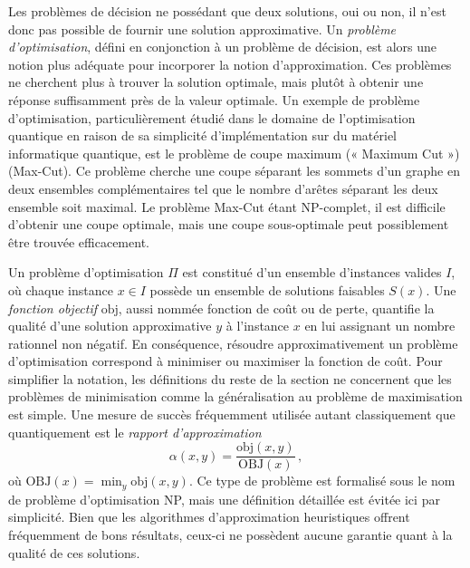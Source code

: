 Les problèmes de décision ne possédant que deux solutions, oui ou non, il n'est donc pas possible de fournir une solution approximative. Un \textit{problème d'optimisation}, défini en conjonction à un problème de décision, est alors une notion plus adéquate pour incorporer la notion d'approximation. Ces problèmes ne cherchent plus à trouver la solution optimale, mais plutôt à obtenir une réponse suffisamment près de la valeur optimale. Un exemple de problème d'optimisation, particulièrement étudié dans le domaine de l'optimisation quantique en raison de sa simplicité d'implémentation sur du matériel informatique quantique, est le problème de coupe maximum (­« Maximum Cut ») (Max-Cut). Ce problème cherche une coupe séparant les sommets d'un graphe en deux ensembles complémentaires tel que le nombre d'arêtes séparant les deux ensemble soit maximal. Le problème Max-Cut étant \textsf{NP}-complet, il est difficile d'obtenir une coupe optimale, mais une coupe sous-optimale peut possiblement être trouvée efficacement.

Un problème d'optimisation $\Pi$ est constitué d'un ensemble d'instances valides $I$, où chaque instance $x \in I$ possède un ensemble de solutions faisables $S(x)$. Une \textit{fonction objectif} $\text{obj}$, aussi nommée fonction de coût ou de perte, quantifie la qualité d'une solution approximative $y$ à l'instance $x$ en lui assignant un nombre rationnel non négatif. En conséquence, résoudre approximativement un problème d'optimisation correspond à minimiser ou maximiser la fonction de coût. Pour simplifier la notation, les définitions du reste de la section ne concernent que les problèmes de minimisation comme la généralisation au problème de maximisation est simple. Une mesure de succès fréquemment utilisée autant classiquement que quantiquement est le \textit{rapport d'approximation}
\begin{equation}
    \alpha(x, y) = \frac{\text{obj}(x, y)}{\text{OBJ}(x)} \,,
\end{equation}
où $\text{OBJ}(x) = \min_{y} \text{obj} (x, y)$. Ce type de problème est formalisé sous le nom de problème d'optimisation \textsf{NP}, mais une définition détaillée est évitée ici par simplicité. Bien que les algorithmes d'approximation heuristiques offrent fréquemment de bons résultats, ceux-ci ne possèdent aucune garantie quant à la qualité de ces solutions.

